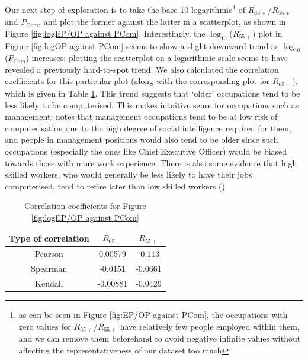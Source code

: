 \documentclass[11pt]{article}
\begin{document}
Our next step of exploration is to take the base 10 logarithmic\footnote{as can be seen in Figure \ref{fig:EP/OP against PCom}, the occupations with zero values for $R_{65+}$/$R_{55+}$ have relatively few people employed within them, and we can remove them beforehand to avoid negative infinite values without affecting the representativeness of our dataset too much} of $R_{65+}$/$R_{55+}$ and $P_{\text{Com}}$, and plot the former against the latter in a scatterplot, as shown in Figure \ref{fig:logEP/OP against PCom}. Interestingly, the $\log_{10}$($R_{55+}$) plot in Figure \ref{fig:logOP against PCom} seems to show a slight downward trend as $\log_{10}$($P_{\text{Com}}$) increases; plotting the scatterplot on a logarithmic scale seems to have revealed a previously hard-to-spot trend. We also calculated the correlation coefficients for this particular plot (along with the corresponding plot for $R_{65+}$), which is given in Table \ref{tab:logcorrelation}. This trend suggests that `older' occupations tend to be less likely to be computerised. This makes intuitive sense for occupations such as management; \cite{osborne2017future} notes that management occupations tend to be at low risk of computerisation due to the high degree of social intelligence required for them, and people in management positions would also tend to be older since such occupations (especially the ones like Chief Executive Officer) would be biased towards those with more work experience. There is also some evidence that high skilled workers, who would generally be less likely to have their jobs computerised, tend to retire later than low skilled workers (\cite{HimmelreicherRalfK.2009Saao}).


\begin{table}[]
\centering
\begin{tabular}{@{}ccc@{}}
\toprule
\textbf{Type of correlation} & \textbf{$R_{65+}$} & \textbf{$R_{55+}$} \\ \midrule
Pearson                      & 0.00579    & -0.113     \\
Spearman                     & -0.0151     & -0.0661     \\
Kendall                      & -0.00881    & -0.0429    \\ \bottomrule
\end{tabular}
\caption{Correlation coefficients for Figure \ref{fig:logEP/OP against PCom}}
\label{tab:logcorrelation}
\end{table}
\end{document}
